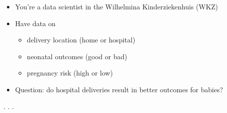 \documentclass[
  letterpaper,
  DIV=11,
  numbers=noendperiod]{scrartcl}
\providecommand{\tightlist}{%
  \setlength{\itemsep}{0pt}\setlength{\parskip}{0pt}}\usepackage{longtable,booktabs,array}
\begin{document}
\begin{itemize}
\tightlist
\item
  You're a data scientist in the Wilhelmina Kinderziekenhuis (WKZ)
\item
  Have data on

  \begin{itemize}
  \tightlist
  \item
    delivery location (home or hospital)
  \item
    neonatal outcomes (good or bad)
  \item
    pregnancy risk (high or low)
  \end{itemize}
\item
  Question: do hospital deliveries result in better outcomes for babies?
\end{itemize}

. . .
\end{document}
